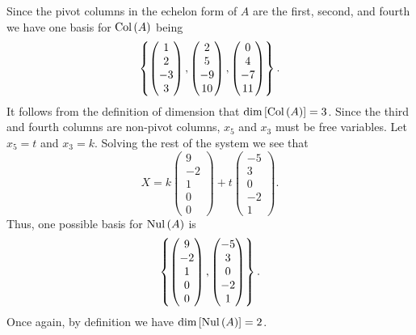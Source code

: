 \documentclass{exam}
\begin{document}
\begin{solution}
    Since the pivot columns in the echelon form of $A$ are the first, second, and fourth we have one basis for $\text{Col}\left(A\right)$ being 
    \[
        \left\{
            \begin{pmatrix}
                1 \\ 2 \\ -3 \\ 3
            \end{pmatrix},
            \begin{pmatrix}
                2 \\ 5 \\ -9 \\ 10
            \end{pmatrix}, 
            \begin{pmatrix}
                0 \\ 4 \\ -7 \\ 11
            \end{pmatrix}
         \right\}.
    \]
    It follows from the definition of dimension that $\dim\left[\text{Col}\left(A\right)\right] = 3$. Since the third and fourth columns are non-pivot columns, $x_5$ and $x_3$ must be free variables. Let $x_5 = t$ and $x_3 = k$. Solving the rest of the system we see that 
    \[
        X = k\begin{pmatrix}
            9 \\ -2 \\ 1 \\ 0 \\ 0
        \end{pmatrix}
        + t\begin{pmatrix}
            -5 \\ 3 \\ 0 \\ -2 \\ 1
        \end{pmatrix}.
    \]
    Thus, one possible basis for $\text{Nul}\left(A\right)$ is 
    \[
        \left\{
            \begin{pmatrix}
                9 \\ -2 \\ 1 \\ 0 \\ 0
            \end{pmatrix},
            \begin{pmatrix}
                -5 \\ 3 \\ 0 \\ -2 \\ 1
            \end{pmatrix}
         \right\}.
    \]
    Once again, by definition we have $\dim\left[\text{Nul}\left(A\right)\right] = 2$.
\end{solution}
\end{document}
